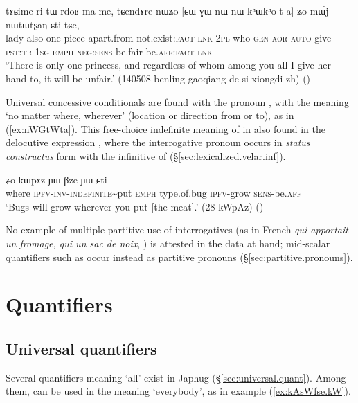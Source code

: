 \begin{exe}
\ex \label{ex:CW.GW.nWnWkhWkhota}
\gll tɤɕime ri tɯ-rdoʁ ma me, tɕendɤre nɯʑo [ɕɯ ɣɯ nɯ-nɯ-kʰɯ\redp{}kʰo-t-a] ʑo mɯ́j-nɯtɯtʂaŋ ɕti tɕe, \\
lady also one-piece apart.from not.exist:\textsc{fact} \textsc{lnk} \textsc{2pl} who \textsc{gen} \textsc{aor}-\textsc{auto}-give-\textsc{pst}:\textsc{tr}-\textsc{1sg} \textsc{emph} \textsc{neg}:\textsc{sens}-be.fair be.\textsc{aff}:\textsc{fact} \textsc{lnk} \\
\glt `There is only one princess, and regardless of whom among you all I give her hand to, it will be unfair.' (140508 benling gaoqiang de si xiongdi-zh)
()
\end{exe}

Universal concessive conditionals are found with the pronoun , with the meaning `no matter where, wherever' (location or direction from or to), as in (\ref{ex:nWGtWta}). This free-choice indefinite meaning of   in also found in the delocutive expression , where the interrogative pronoun occurs in  \textit{status constructus} form  with the infinitive of   (§\ref{sec:lexicalized.velar.inf}).

\begin{exe}
\ex \label{ex:nWGtWta}
 ʑo kɯpɤz ɲɯ-βze ɲɯ-ɕti\\
 where \textsc{ipfv}-\textsc{inv}-\textsc{indefinite}\textasciitilde{}put \textsc{emph} type.of.bug \textsc{ipfv}-grow \textsc{sens}-be.\textsc{aff}\\
\glt `Bugs will grow wherever you put [the meat].' (28-kWpAz) ()
\end{exe}


No example of multiple partitive use of interrogatives (as in French \textit{qui apportait un fromage, qui un sac de noix}, \citealt[177]{haspelmath97indef} ) is attested in the data at hand; mid-scalar quantifiers such as  occur instead as partitive pronouns (§\ref{sec:partitive.pronouns}). 


\section{Quantifiers} \label{sec:quantifiers.pronouns} \label{sec:aRandWndAt}


\subsection{Universal quantifiers} \label{sec:universal.pronouns}
Several quantifiers meaning `all' exist in Japhug (§\ref{sec:universal.quant}). Among them,  can be used in the meaning `everybody', as in example (\ref{ex:kAsWfse.kW}).

